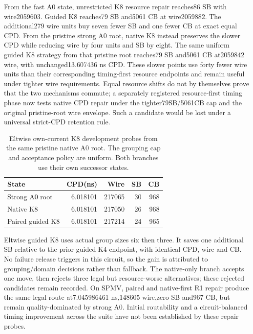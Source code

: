 \documentclass[conference,10pt]{IEEEtran}
\begin{document}
From the fast A0 state, unrestricted K8 resource repair reaches86 SB with wire2059603. Guided K8 reaches79 SB and5061 CB at wire2059882. The additional279 wire units buy seven fewer SB and one fewer CB at exact equal CPD. From the pristine strong A0 root, native K8 instead preserves the slower CPD while reducing wire by four units and SB by eight. The same uniform guided K8 strategy from that pristine root reaches79 SB and5061 CB at2059842 wire, with unchanged13.607436 ns CPD. These slower points use forty fewer wire units than their corresponding timing-first resource endpoints and remain useful under tighter wire requirements. Equal resource shifts do not by themselves prove that the two mechanisms commute; a separately registered resource-first timing phase now tests native CPD repair under the tighter79SB/5061CB cap and the original pristine-root wire envelope. Such a candidate would be lost under a universal strict-CPD retention rule.

\begin{table}[t]
\centering\caption{Eltwise own-current K8 development probes from the same pristine native A0 root. The grouping cap and acceptance policy are uniform. Both branches use their own successor states.}
\label{tab:eltwise}
\small
\begin{tabular}{lrrrr}\hline
State & CPD(ns) & Wire & SB & CB\\\hline
Strong A0 root &6.018101&217065&30&968\\
Native K8 &6.018101&217050&26&968\\
Paired guided K8 &6.018101&217214&24&965\\\hline
\end{tabular}
\end{table}
Eltwise guided K8 uses actual group sizes six then three. It saves one additional SB relative to the prior guided K4 endpoint, with identical CPD, wire and CB. No failure release triggers in this circuit, so the gain is attributed to grouping/domain decisions rather than fallback. The native-only branch accepts one move, then rejects three legal but resource-worse alternatives; these rejected candidates remain recorded. On SPMV, paired and native-first R1 repair produce the same legal route at7.045986461 ns,148605 wire,zero SB and967 CB, but remain quality-dominated by strong A0. Initial routability and a circuit-balanced timing improvement across the suite have not been established by these repair probes.
\end{document}
